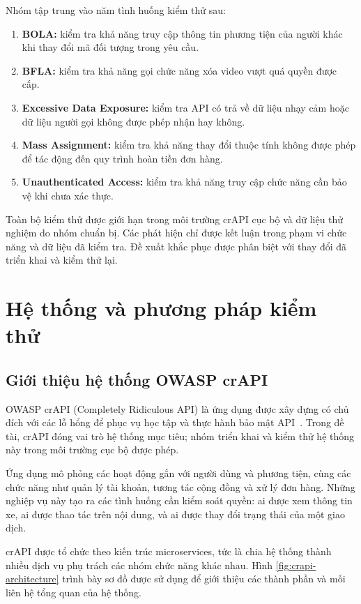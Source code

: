 \documentclass[oneside,a4paper,12pt]{extreport}
\begin{document}
Nhóm tập trung vào năm tình huống kiểm thử sau:
\begin{enumerate}
    \item \textbf{BOLA:} kiểm tra khả năng truy cập thông tin phương tiện
    của người khác khi thay đổi mã đối tượng trong yêu cầu.
    \item \textbf{BFLA:} kiểm tra khả năng gọi chức năng xóa video vượt
    quá quyền được cấp.
    \item \textbf{Excessive Data Exposure:} kiểm tra API có trả về dữ
    liệu nhạy cảm hoặc dữ liệu người gọi không được phép nhận hay không.
    \item \textbf{Mass Assignment:} kiểm tra khả năng thay đổi thuộc
    tính không được phép để tác động đến quy trình hoàn tiền đơn hàng.
    \item \textbf{Unauthenticated Access:} kiểm tra khả năng truy cập
    chức năng cần bảo vệ khi chưa xác thực.
\end{enumerate}

Toàn bộ kiểm thử được giới hạn trong môi trường crAPI cục bộ và dữ liệu
thử nghiệm do nhóm chuẩn bị. Các phát hiện chỉ được kết luận trong
phạm vi chức năng và dữ liệu đã kiểm tra. Đề xuất khắc phục được phân
biệt với thay đổi đã triển khai và kiểm thử lại.

\clearpage
\chapter{Hệ thống và phương pháp kiểm thử}
\label{chap:methodology}

\section{Giới thiệu hệ thống OWASP crAPI}

OWASP crAPI (Completely Ridiculous API) là ứng dụng được xây dựng có chủ
đích với các lỗ hổng để phục vụ học tập và thực hành bảo mật API~\cite{crapi}. Trong
đề tài, crAPI đóng vai trò hệ thống mục tiêu; nhóm triển khai và kiểm
thử hệ thống này trong môi trường cục bộ được phép.

Ứng dụng mô phỏng các hoạt động gắn với người dùng và phương tiện, cùng
các chức năng như quản lý tài khoản, tương tác cộng đồng và xử lý đơn
hàng. Những nghiệp vụ này tạo ra các tình huống cần kiểm soát quyền:
ai được xem thông tin xe, ai được thao tác trên nội dung, và ai được thay
đổi trạng thái của một giao dịch.

crAPI được tổ chức theo kiến trúc microservices, tức là chia hệ thống
thành nhiều dịch vụ phụ trách các nhóm chức năng khác nhau. Hình
\ref{fig:crapi-architecture} trình bày sơ đồ được sử dụng để giới thiệu
các thành phần và mối liên hệ tổng quan của hệ thống.
\end{document}
